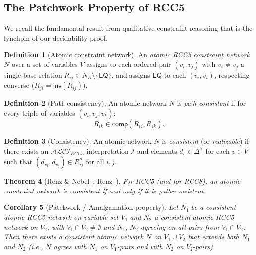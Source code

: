 \documentclass[a4paper,11pt]{article}
\newtheorem{theorem}{Theorem}[section]
\newtheorem{corollary}[theorem]{Corollary}
\theoremstyle{definition}
\newtheorem{definition}[theorem]{Definition}
\newcommand{\ALCIRCC}[1]{\ensuremath{\mathcal{ALCI}_{\mathit{RCC#1}}}}
\newcommand{\NR}{\ensuremath{N_R}}
\newcommand{\DeltaI}{\ensuremath{\Delta^{\mathcal{I}}}}
\newcommand{\interp}{\ensuremath{\mathcal{I}}}
\newcommand{\EQ}{\ensuremath{\mathsf{EQ}}}
\newcommand{\inv}{\ensuremath{\mathsf{inv}}}
\newcommand{\comp}{\ensuremath{\mathsf{comp}}}
\begin{document}
\subsection{The Patchwork Property of RCC5}
\label{sec:patchwork}

We recall the fundamental result from qualitative constraint reasoning
that is the lynchpin of our decidability proof.

\begin{definition}[Atomic constraint network]
An \emph{atomic RCC5 constraint network} $N$ over a set of variables
$V$ assigns to each ordered pair $(v_i, v_j)$ with $v_i \neq v_j$ a
single base relation $R_{ij} \in \NR \setminus \{\EQ\}$, and assigns
$\EQ$ to each $(v_i, v_i)$, respecting converse ($R_{ji} =
\inv(R_{ij})$).
\end{definition}

\begin{definition}[Path consistency]
An atomic network $N$ is \emph{path-consistent} if for every triple
of variables $(v_i, v_j, v_k)$:
\[
  R_{ik} \in \comp(R_{ij}, R_{jk}).
\]
\end{definition}

\begin{definition}[Consistency]
An atomic network $N$ is \emph{consistent} (or \emph{realizable}) if
there exists an $\ALCIRCC{5}$ interpretation $\interp$ and elements
$d_{v} \in \DeltaI$ for each $v \in V$ such that $(d_{v_i}, d_{v_j})
\in R_{ij}^{\interp}$ for all $i,j$.
\end{definition}

\begin{theorem}[Renz \& Nebel~\cite{RenzNebel1999}; Renz~\cite{Renz1999}]
\label{thm:patchwork}
For RCC5 \textup{(}and for RCC8\textup{)}, an atomic constraint
network is consistent if and only if it is path-consistent.
\end{theorem}

\begin{corollary}[Patchwork / Amalgamation property]
\label{cor:patchwork}
Let $N_1$ be a consistent atomic RCC5 network on variable set $V_1$
and $N_2$ a consistent atomic RCC5 network on $V_2$, with $V_1 \cap
V_2 \neq \emptyset$ and $N_1$, $N_2$ agreeing on all pairs from $V_1
\cap V_2$.  Then there exists a consistent atomic network $N$ on $V_1
\cup V_2$ that extends both $N_1$ and $N_2$ \textup{(}i.e., $N$
agrees with $N_1$ on $V_1$-pairs and with $N_2$ on
$V_2$-pairs\textup{)}.
\end{corollary}
\end{document}

